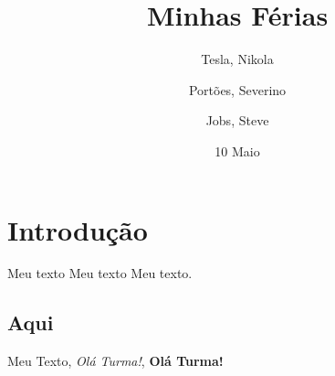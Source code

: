 \documentclass[a4paper,11pt,twocolumn]{article}
\title{Minhas Férias}
\author{Tesla, Nikola \and Portões, Severino \and Jobs, Steve}
\date{10 Maio}
\begin{document}
  \maketitle
  \tableofcontents

  \section{Introdução}
    Meu texto  Meu texto  Meu texto.

  \subsection{Aqui}
    Meu Texto, \textit{Olá Turma!}, \textbf{Olá Turma!}
\end{document}
